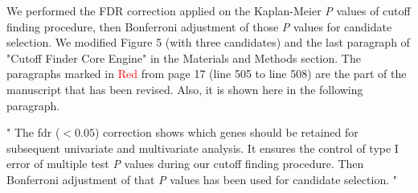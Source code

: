 \documentclass[preprint,12pt]{elsarticle}
\newenvironment{MyIndent}
{\par\leftskip1cm\relax\rightskip1cm\relax}
{\par\leftskip0cm\relax\rightskip0cm\relax}
\newenvironment{MyColorPar}[1]{%
    \leavevmode\color{#1}\ignorespaces%
}{%
}%
\begin{document}
\begin{MyColorPar}{blue}
We performed the FDR correction applied on the Kaplan-Meier \textit{P} values of cutoff finding procedure, then Bonferroni adjustment of those \textit{P} values for candidate selection.
We modified Figure 5 (with three candidates) and the last paragraph of "Cutoff Finder Core Engine" in the Materials and Methods section.
The paragraphs marked in \textcolor{red}{Red} from page 17 (line 505 to line 508) are the part of the manuscript that has been revised. Also, it is shown here in the following paragraph.
\\[0.3cm]


\begin{MyIndent}
\begin{MyColorPar}{red}

"
The \acrfull{fdr} ($< 0.05$) correction\cite{Benjamini1995a} shows which genes should be retained for subsequent univariate and multivariate analysis.
It ensures the control of type I error of multiple test \textit{P} values during our cutoff finding procedure.
Then Bonferroni adjustment of that \textit{P} values has been used for candidate selection.
"
\end{MyColorPar} %
\end{MyIndent}

\end{MyColorPar}
\end{document}
